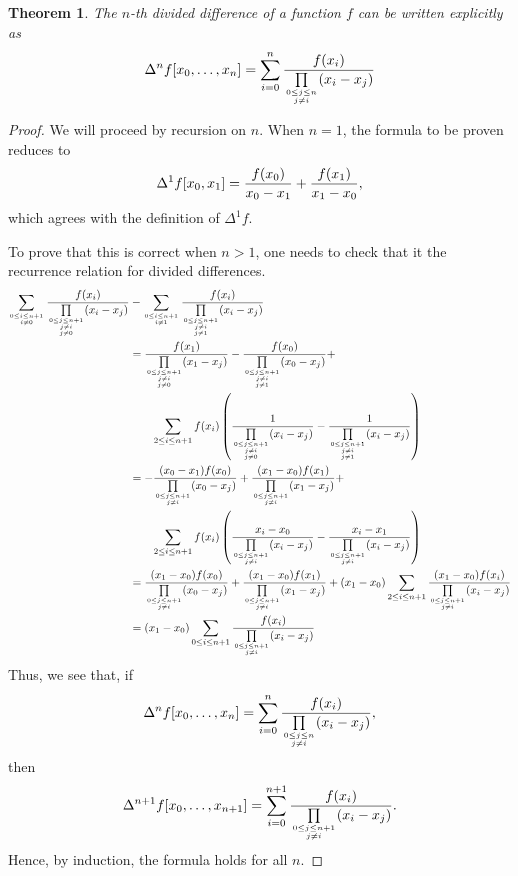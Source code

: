 \documentclass[12pt]{article}
\newtheorem{thm}{Theorem}
\begin{document}
\begin{thm}
The $n$-th divided difference of a function $f$ can be written explicitly as
\[
\Delta^n f [x_0, \ldots , x_n] = 
\sum_{i=0}^n 
{f(x_i) \over \prod\limits_{0 \le j \le n \atop j \ne i} (x_i - x_j)}
\]
\end{thm}

\begin{proof}
We will proceed by recursion on $n$.  When $n=1$, the formula to be proven
reduces to
\[
\Delta^1 f [x_0, x_1] =
{f(x_0) \over x_0 - x_1} +
{f(x_1) \over x_1 - x_0},
\]
which agrees with the definition of $\Delta^1 f$.

To prove that this  is correct when $n > 1$, one needs to check that it  the recurrence relation for divided differences.
\begin{align*}
\sum_{0 \le i \le n+1 \atop i \neq 0} 
{f(x_i) \over \prod\limits_{0 \le j \le n+1 \atop 
  {j \ne i \atop j \neq 0}} (x_i - x_j)} &-
\sum_{0 \le i \le n+1 \atop i \neq 1} 
{f(x_i) \over \prod\limits_{0 \le j \le n+1 \atop 
  {j \ne i \atop j \neq 1}} (x_i - x_j)} \\ &=
{f(x_1) \over \prod\limits_{0 \le j \le n+1 \atop 
  {j \ne i \atop j \neq 0}} (x_1 - x_j)} -
{f(x_0) \over \prod\limits_{0 \le j \le n+1 \atop 
  {j \ne i \atop j \neq 1}} (x_0 - x_j)} + \\
&\qquad \sum_{2 \le i \le n+1} f(x_i) \left(
{1 \over \prod\limits_{0 \le j \le n+1 \atop 
  {j \ne i \atop j \neq 0}} (x_i - x_j)} -
{1 \over \prod\limits_{0 \le j \le n+1 \atop 
  {j \ne i \atop j \neq 1}} (x_i - x_j)} \right) \\ &=
-{(x_0 - x_1) f(x_0) \over \prod\limits_{0 \le j \le n+1 
  \atop j \ne i} (x_0 - x_j)} +
{(x_1 - x_0) f(x_1) \over \prod\limits_{0 \le j \le n+1 
  \atop j \ne i} (x_1 - x_j)} + \\
&\qquad \sum_{2 \le i \le n+1} f(x_i) \left(
{x_i - x_0 \over \prod\limits_{0 \le j \le n+1 \atop 
  j \ne i} (x_i - x_j)} -
{x_i - x_1 \over \prod\limits_{0 \le j \le n+1 \atop 
  j \ne i} (x_i - x_j)} \right) \\ &=
{(x_1 - x_0) f(x_0) \over \prod\limits_{0 \le j \le n+1 
  \atop j \ne i} (x_0 - x_j)} +
{(x_1 - x_0) f(x_1) \over \prod\limits_{0 \le j \le n+1 
  \atop j \ne i} (x_1 - x_j)} +
(x_1 - x_0) \sum_{2 \le i \le n+1}
{(x_1 - x_0) f(x_i) \over \prod\limits_{0 \le j \le n+1 \atop 
  j \ne i} (x_i - x_j)} \\ &=
(x_1 - x_0) \sum_{0 \le i \le n+1}
{f(x_i) \over \prod\limits_{0 \le j \le n+1 \atop 
  j \ne i} (x_i - x_j)}
\end{align*}
Thus, we see that, if
\[
\Delta^n f [x_0, \ldots , x_n] = 
\sum_{i=0}^n 
{f(x_i) \over \prod\limits_{0 \le j \le n \atop j \ne i} (x_i - x_j)},
\]
then
\[
\Delta^{n+1} f [x_0, \ldots , x_{n+1}] = 
\sum_{i=0}^{n+1} 
{f(x_i) \over \prod\limits_{0 \le j \le n+1 \atop j \ne i} (x_i - x_j)}.
\]
Hence, by induction, the formula holds for all $n$.
\end{proof}
\end{document}
